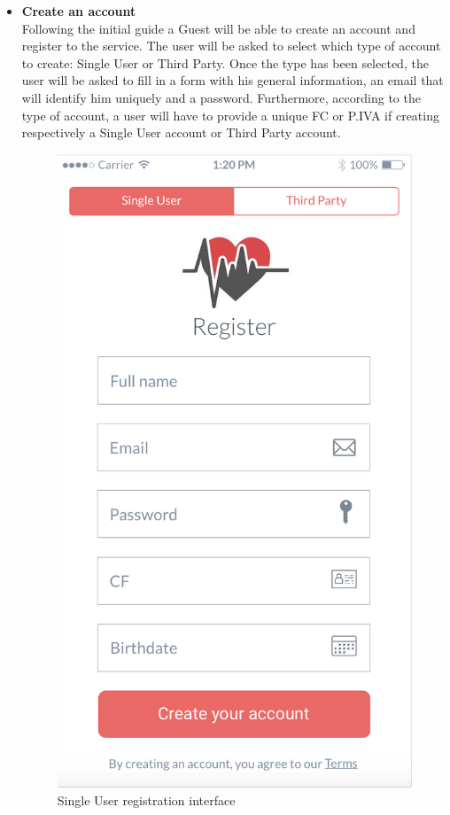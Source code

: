 \documentclass[titlepage]{article}
\begin{document}
\begin{itemize}
\begin{itemize}
				\item{\bf Create an account}\\
				Following the initial guide a Guest will be able to create an account and register to the service. The user will be asked to select which type of account to create: Single User or Third Party. Once the type has been selected, the user will be asked to fill in a form with his general information, an email that will identify him uniquely and a password. Furthermore, according to the type of account, a user will have to provide a unique FC or P.IVA if creating respectively a Single User account or Third Party account.\\
					\begin{figure}[H]
						\center
  						\includegraphics[width=0.5\columnwidth]{Mockup/mockupRegisterSU.png}
  						\caption{Single User registration interface}
 					 	\label{fig:SURegister}
					\end{figure}


\end{itemize}
\end{itemize}
\end{document}
